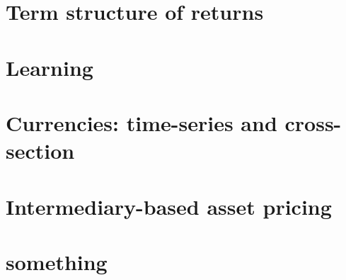 \documentclass[12pt,openany]{report}
\begin{document}
\chapter{Term structure of returns}


\chapter{Learning}


\chapter{Currencies: time-series and cross-section}


\chapter{Intermediary-based asset pricing}


\chapter{something}

\newpage


\end{document}

